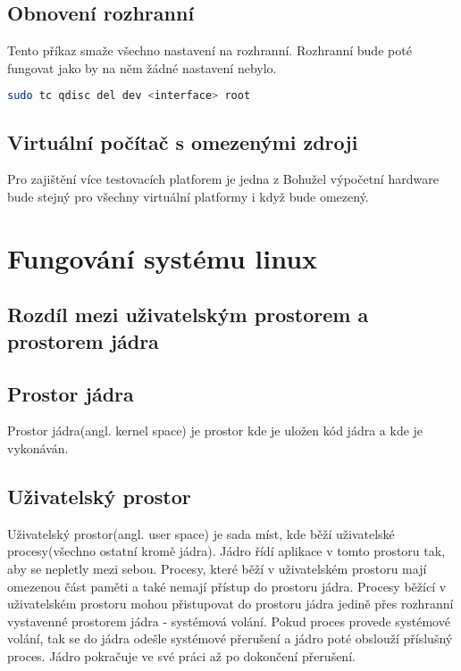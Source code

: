 \subsection*{Obnovení rozhranní}
Tento příkaz smaže všechno nastavení na rozhranní. Rozhranní bude poté fungovat jako by na něm žádné nastavení nebylo.
\begin{lstlisting}[language=bash]
    sudo tc qdisc del dev <interface> root
\end{lstlisting}

\subsection{Virtuální počítač s omezenými zdroji}

Pro zajištění více testovacích platforem je jedna z
Bohužel výpočetní hardware bude stejný pro všechny virtuální platformy i když bude omezený.

\iffalse
\subsection*{Raspberry pi}
\fi



\section{Fungování systému linux}

\subsection{Rozdíl mezi uživatelským prostorem a prostorem jádra}

\subsection*{Prostor jádra}
Prostor jádra(angl. kernel space) je prostor kde je uložen kód jádra a kde je vykonáván.

\subsection*{Uživatelský prostor}
Uživatelský prostor(angl. user space) je sada míst, kde běží uživatelské procesy(všechno ostatní kromě jádra). Jádro řídí aplikace v tomto prostoru tak, aby se nepletly mezi sebou.
Procesy, které běží v uživatelském prostoru mají omezenou část paměti a také nemají přístup do prostoru jádra. Procesy běžící v uživatelském prostoru mohou přistupovat do prostoru jádra
jedině přes rozhranní vystavenné prostorem jádra - systémová volání. Pokud proces provede systémové volání, tak se do jádra odešle systémové přerušení a jádro poté obslouží
příslušný proces. Jádro pokračuje ve své práci až po dokončení přerušení.

